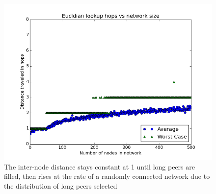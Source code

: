 \begin{figure}
\centering
\includegraphics[width=\linewidth]{figs/EucldianDistance}
\caption{The inter-node distance stays constant at 1 until long peers are filled, then rises at the rate of a randomly connected network due to the distribution of long peers selected}
\label{fig:EucldianDistance}
\end{figure}

